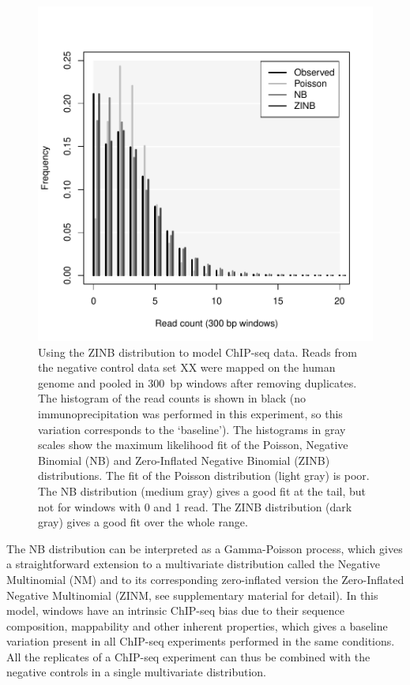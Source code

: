 \documentclass{bioinfo}
\begin{document}
\begin{methods}
\begin{figure}[!tpb]
\centerline{\includegraphics[scale=0.55]{ZINB_fit.pdf}}
\caption{
  Using the ZINB distribution to model ChIP-seq data. Reads from
  the negative control data set XX were mapped on the human genome and
  pooled in 300~bp windows after removing duplicates. The histogram of
  the read counts is shown in black (no immunoprecipitation was
  performed in this experiment, so this variation corresponds to the
  `baseline'). The histograms in gray scales show the maximum
  likelihood fit of the Poisson, Negative Binomial (NB) and
  Zero-Inflated Negative Binomial (ZINB) distributions. The fit of
  the Poisson distribution (light gray) is poor. The NB distribution
  (medium gray) gives a good fit at the tail, but not for windows with
  0 and 1 read. The ZINB distribution (dark gray) gives a good fit
  over the whole range.
}\label{fig:ZINB_fit}
\end{figure}

The NB distribution can be interpreted as a Gamma-Poisson process,
which gives a straightforward extension to a multivariate
distribution called the Negative Multinomial (NM) and to its
corresponding zero-inflated version the Zero-Inflated Negative
Multinomial (ZINM, see supplementary material for detail). In this model,
windows have an intrinsic ChIP-seq bias due to their sequence composition,
mappability and other inherent properties, which gives a baseline
variation present in all ChIP-seq experiments performed in the same
conditions. All the replicates of a ChIP-seq experiment can thus be
combined with the negative controls in a single multivariate
distribution.


\end{methods}
\end{document}
